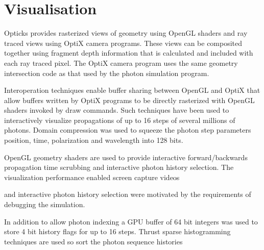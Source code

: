 \documentclass[a4paper]{jpconf}
\begin{document}

\section{Visualisation}

Opticks provides rasterized views of geometry using OpenGL shaders
and ray traced views using OptiX camera programs.
These views can be composited together using fragment depth information 
that is calculated and included with each ray traced pixel.
The OptiX camera program uses the same geometry intersection 
code as that used by the photon simulation program.  

Interoperation techniques enable buffer sharing between OpenGL and OptiX 
that allow buffers written by OptiX programs to be directly rasterized 
with OpenGL shaders invoked by draw commands. Such techniques 
have been used to interactively visualize propagations of up to 16 
steps of several millions of photons. Domain compression was used 
to squeeze the photon step parameters position, time, polarization 
and wavelength into 128 bits. 

OpenGL geometry shaders are used to provide interactive forward/backwards propagation time scrubbing
and interactive photon history selection. The visualization performance enabled
screen capture videos  
 
and interactive photon history selection were motivated by the requirements
of debugging the simulation.

%

In addition to allow photon 
indexing a GPU buffer of 64 bit integers was used to store 4 bit history flags for up to 16 steps.
Thrust sparse histogramming techniques are used so sort the photon sequence histories 
\end{document}
